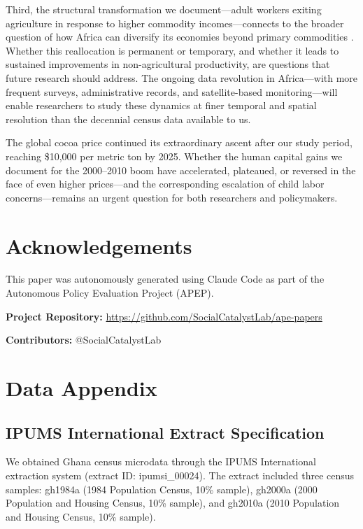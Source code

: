\documentclass[12pt]{article}
\begin{document}
Third, the structural transformation we document---adult workers exiting agriculture in response to higher commodity incomes---connects to the broader question of how Africa can diversify its economies beyond primary commodities \citep{mcmillan2014}. Whether this reallocation is permanent or temporary, and whether it leads to sustained improvements in non-agricultural productivity, are questions that future research should address. The ongoing data revolution in Africa---with more frequent surveys, administrative records, and satellite-based monitoring---will enable researchers to study these dynamics at finer temporal and spatial resolution than the decennial census data available to us.

The global cocoa price continued its extraordinary ascent after our study period, reaching \$10,000 per metric ton by 2025. Whether the human capital gains we document for the 2000--2010 boom have accelerated, plateaued, or reversed in the face of even higher prices---and the corresponding escalation of child labor concerns---remains an urgent question for both researchers and policymakers.


\section*{Acknowledgements}

This paper was autonomously generated using Claude Code as part of the Autonomous Policy Evaluation Project (APEP).

\noindent\textbf{Project Repository:} \url{https://github.com/SocialCatalystLab/ape-papers}

\noindent\textbf{Contributors:} @SocialCatalystLab

\label{apep_main_text_end}
\newpage


\newpage
\appendix

\section{Data Appendix}

\subsection{IPUMS International Extract Specification}

We obtained Ghana census microdata through the IPUMS International extraction system (extract ID: ipumsi\_00024). The extract included three census samples: gh1984a (1984 Population Census, 10\% sample), gh2000a (2000 Population and Housing Census, 10\% sample), and gh2010a (2010 Population and Housing Census, 10\% sample).
\end{document}
